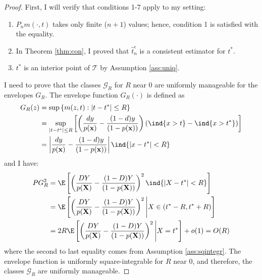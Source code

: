 {\begin{proof}
First, I will verify that conditions 1-7 apply to my setting:
\begin{enumerate}
    \item $P_n m(\cdot, t)$ takes only finite ($n+1$) values; hence, condition 1 is satisfied with the equality.
    \item In Theorem \ref{thm:con}, I proved that $\hat{t}^e_n$ is a consistent estimator for $t^*$.
    \item $t^*$ is an interior point of $\mathcal{T}$ by Assumption \ref{ass:uniq}.
\end{enumerate}

I need to prove that the classes $\mathcal{G}_R$ for $R$ near 0 are uniformly manageable for the envelopes $G_R$. The envelope function $G_R(\cdot)$ is defined as
\begin{align}
    G_R(z) & =\sup \left\{m(z,t):\left|t-t^*\right| \leq R\right\} \\
    & =\sup _{\left|t-t^*\right| \leq R}\left[\left(\frac{d y}{p(\textbf{x})} - \frac{(1-d) y}{(1-p(\textbf{x}))} \right) \left(\ind\{x > t\} - \ind\{x > t^*\} \right)\right] \\
    & =\left|\frac{d y}{p(\textbf{x})} - \frac{(1-d) y}{(1-p(\textbf{x}))}\right| \ind\{\left|x-t^*\right| < R\}
\end{align}
and I have:
\begin{align} \label{eq:pgrO}
    P G_R^2 & =\E \left[ \left(\frac{DY}{p(\textbf{X})} - \frac{(1-D) Y}{(1-p(\textbf{X}))}\right)^2 \ind\{\left|X-t^*\right| < R\} \right]\\
    & = \E \left[ \left(\frac{DY}{p(\textbf{X})} - \frac{(1-D) Y}{(1-p(\textbf{X}))}\right)^2 \Bigg| X \in (t^*-R,t^*+R) \right]\\
    & = 2 R\E \left[ \left(\frac{DY}{p(\textbf{X})} - \frac{(1-D) Y}{(1-p(\textbf{X}))}\right)^2 \Bigg| X =t^* \right] + o(1) = O(R)
\end{align}
where the second to last equality comes from Assumption \ref{ass:sqintegr}. The envelope function is uniformly square-integrable for $R$ near 0, and therefore, the classes $\mathcal{G}_R$ are uniformly manageable.


\end{proof}}
